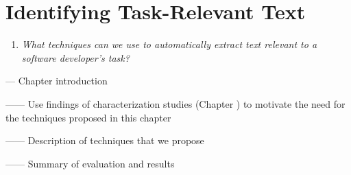 \setcounter{chapter}{4}
\setcounter{rq}{1}


\chapter{Identifying Task-Relevant Text}
\label{ch:identifying}



\vspace{1mm}

\begin{enumerate}[label=\textit{RQ\arabic*},leftmargin=1.4cm]

\item \textit{What techniques can we use to automatically extract text relevant to a software developer's task?} 

\end{enumerate}

\vspace{1mm}

--- Chapter introduction 

------ Use findings of characterization studies (Chapter ) to motivate the need for the techniques proposed in this chapter

------ Description of techniques that we propose


------ Summary of evaluation and results




\clearpage








